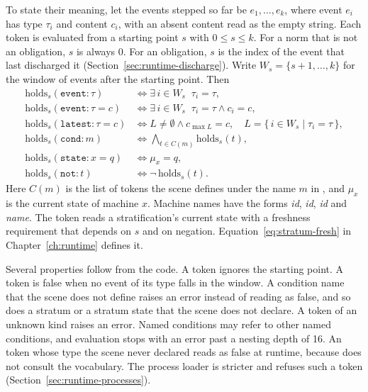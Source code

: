 To state their meaning, let the events stepped so far be $e_1, \dots, e_k$, where event $e_i$ has
type $\tau_i$ and content $c_i$, with an absent content read as the empty string. Each token is
evaluated from a starting point $s$ with $0 \le s \le k$. For a norm that is not an obligation, $s$
is always $0$. For an obligation, $s$ is the index of the event that last discharged it
(Section~\ref{sec:runtime-discharge}). Write $W_s = \{s+1, \dots, k\}$ for the window of events after
the starting point. Then
\begin{align}
\mathrm{holds}_s(\mathtt{event}{:}\tau) &\iff \exists\, i \in W_s \;\; \tau_i = \tau,
\label{eq:tok-event}\\
\mathrm{holds}_s(\mathtt{event}{:}\tau{=}c) &\iff \exists\, i \in W_s \;\; \tau_i = \tau \wedge c_i = c,
\label{eq:tok-event-content}\\
\mathrm{holds}_s(\mathtt{latest}{:}\tau{=}c) &\iff L \ne \emptyset \wedge c_{\max L} = c,
\quad L = \{\, i \in W_s \mid \tau_i = \tau \,\},
\label{eq:tok-latest}\\
\mathrm{holds}_s(\mathtt{cond}{:}m) &\iff \textstyle\bigwedge_{t \in C(m)} \mathrm{holds}_s(t),
\label{eq:tok-cond}\\
\mathrm{holds}_s(\mathtt{state}{:}x{=}q) &\iff \mu_x = q,
\label{eq:tok-state}\\
\mathrm{holds}_s(\mathtt{not}{:}t) &\iff \neg\, \mathrm{holds}_s(t).
\label{eq:tok-not}
\end{align}
Here $C(m)$ is the list of tokens the scene defines under the name $m$ in
, and $\mu_x$ is the current state of machine $x$. Machine names have the
forms \textit{id}, \textit{id}, \textit{id} and
\textit{name}. The  token reads a stratification's current state with
a freshness requirement that depends on $s$ and on negation. Equation~\eqref{eq:stratum-fresh} in
Chapter~\ref{ch:runtime} defines it.

Several properties follow from the code. A  token ignores the starting point. A
 token is false when no event of its type falls in the window. A condition name that
the scene does not define raises an error instead of reading as false, and so does a stratum or a
stratum state that the scene does not declare. A token of an unknown kind raises an error. Named
conditions may refer to other named conditions, and evaluation stops with an error past a nesting
depth of 16. An  token whose type the scene never declared reads as false at runtime,
because  does not consult the vocabulary. The process loader is stricter and refuses such
a token (Section~\ref{sec:runtime-processes}).

